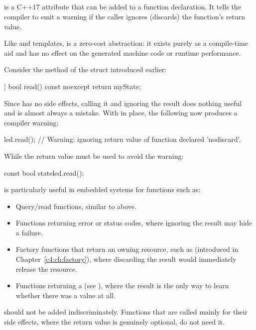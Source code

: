 \subsection{\code{[[nodiscard]]}}
\label{c1:sec:nodiscard}
\code{[[nodiscard]]} is a C++17 attribute that can be added to a function declaration. It tells the
compiler to emit a warning if the caller ignores (discards) the function's return value.

Like  and templates, \code{[[nodiscard]]} is a zero-cost abstraction: it exists
purely as a compile-time aid and has no effect on the generated machine code or runtime
performance.

Consider the  method of the  struct introduced earlier:

\begin{cppcode}
[[nodiscard]] bool read() const noexcept { return myState; }
\end{cppcode}

\noindent Since  has no side effects, calling it and ignoring the result does nothing
useful and is almost always a mistake. With \code{[[nodiscard]]} in place, the following now
produces a compiler warning:

\begin{cppcode}
led.read(); // Warning: ignoring return value of function declared 'nodiscard'.
\end{cppcode}

\noindent While the return value must be used to avoid the warning:

\begin{cppcode}
const bool state{led.read()};
\end{cppcode}

\noindent \code{[[nodiscard]]} is particularly useful in embedded systems for functions such as:
\begin{itemize}
  \item Query/read functions, similar to  above.
  \item Functions returning error or status codes, where ignoring the result may hide a failure.
  \item Factory functions that return an owning resource, such as 
    (introduced in Chapter~\ref{c4:ch:factory}), where discarding the result would immediately
    release the resource.
  \item Functions returning a  (see ), where the result
    is the only way to learn whether there was a value at all.
\end{itemize}
\note \code{[[nodiscard]]} should not be added indiscriminately. Functions that are called mainly
for their side effects, where the return value is genuinely optional, do not need it.

